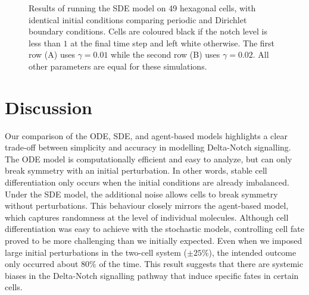 \documentclass{article}
\begin{document}
\begin{figure}[!htp]
   \caption{Results of running the SDE model on 49 hexagonal cells, with identical initial conditions comparing periodic and Dirichlet boundary conditions. Cells are coloured black if the notch level is less than $1$ at the final time step and left white otherwise. The first row (A) uses $\gamma = 0.01$ while the second row (B) uses $\gamma = 0.02$. All other parameters are equal for these simulations. }
   \label{fig:hexagonal-compare}
\end{figure}

\section*{Discussion}

Our comparison of the ODE, SDE, and agent-based models highlights a clear trade-off between simplicity and accuracy in modelling Delta-Notch signalling.
The ODE model is computationally efficient and easy to analyze, but can only break symmetry with an initial perturbation.
In other words, stable cell differentiation only occurs when the initial conditions are already imbalanced.
Under the SDE model, the additional noise allows cells to break symmetry without perturbations.
This behaviour closely mirrors the agent-based model, which captures randomness at the level of individual molecules.
Although cell differentiation was easy to achieve with the stochastic models, controlling cell fate proved to be more challenging than we initially expected.
Even when we imposed large initial perturbations in the two-cell system ($\pm 25\%$), the intended outcome only occurred about $80\%$ of the time.
This result suggests that there are systemic biases in the Delta-Notch signalling pathway that induce specific fates in certain cells. 
\end{document}
